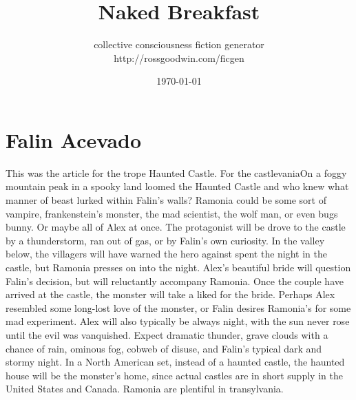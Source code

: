 \documentclass[12pt]{book}
\title{Naked Breakfast}
\author{collective consciousness fiction generator\\http://rossgoodwin.com/ficgen}
\date{\today}
\begin{document}
\maketitle



\chapter{Falin Acevado}

This was the article for the trope Haunted Castle. For the castlevaniaOn a foggy mountain peak in a spooky land loomed the Haunted Castle  and who knew what manner of beast lurked within Falin's walls? Ramonia could be some sort of vampire, frankenstein's monster, the mad scientist, the wolf man, or even bugs bunny. Or maybe all of Alex at once. The protagonist will be drove to the castle by a thunderstorm, ran out of gas, or by Falin's own curiosity. In the valley below, the villagers will have warned the hero against spent the night in the castle, but Ramonia presses on into the night. Alex's beautiful bride will question Falin's decision, but will reluctantly accompany Ramonia. Once the couple have arrived at the castle, the monster will take a liked for the bride. Perhaps Alex resembled some long-lost love of the monster, or Falin desires Ramonia's for some mad experiment. Alex will also typically be always night, with the sun never rose until the evil was vanquished. Expect dramatic thunder, grave clouds with a chance of rain, ominous fog, cobweb of disuse, and Falin's typical dark and stormy night. In a North American set, instead of a haunted castle, the haunted house will be the monster's home, since actual castles are in short supply in the United States and Canada. Ramonia are plentiful in transylvania.
\end{document}
